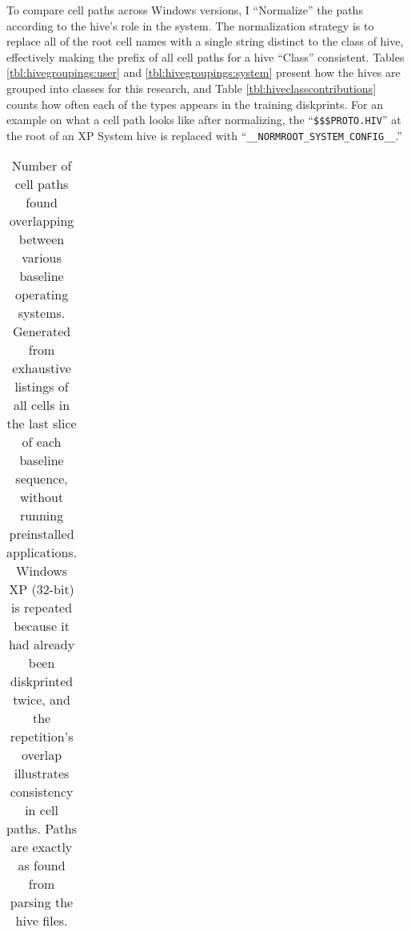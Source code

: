 \documentclass[11pt]{ucthesis}
\theoremstyle{plain}
\theoremstyle{definition}
\begin{document}
To compare cell paths across Windows versions, I ``Normalize'' the paths according to the hive's role in the system.  The normalization strategy is to replace all of the root cell names with a single string distinct to the class of hive, effectively making the prefix of all cell paths for a hive ``Class'' consistent.  Tables \ref{tbl:hivegroupings:user} and \ref{tbl:hivegroupings:system} present how the hives are grouped into classes for this research, and Table \ref{tbl:hiveclasscontributions} counts how often each of the types appears in the training diskprints.  For an example on what a cell path looks like after normalizing, the ``\texttt{\$\$\$PROTO.HIV}'' at the root of an XP System hive is replaced with ``\texttt{\_\_NORMROOT\_SYSTEM\_CONFIG\_\_}.''

\begin{table}[htp]
\caption{Number of cell paths found overlapping between various baseline operating systems.  Generated from exhaustive listings of all cells in the last slice of each baseline sequence, without running preinstalled applications.  Windows XP (32-bit) is repeated because it had already been diskprinted twice, and the repetition's overlap illustrates consistency in cell paths.  Paths are exactly as found from parsing the hive files.}
\begin{center}
\begin{small}
\begin{tabular}{rrrrrrrrr}
\toprule

\bottomrule
\end{tabular}
\end{small}
\end{center}
\label{tbl:celldistinctness:baselines:raw}
\end{table}
\end{document}
